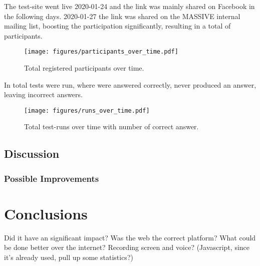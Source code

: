 \documentclass[nofilelist]{cslthse-msc}
\begin{document}
				The test-site went live 2020-01-24 and the link was mainly shared on
				Facebook in the following days. 2020-01-27 the link was shared on
				the MASSIVE internal mailing list, boosting the participation
				significantly, resulting in a total of
				 participants.

				\begin{figure}[h!]
					\centering
					\texttt{[image: figures/participants\_over\_time.pdf]}
					\caption{Total registered participants over time.}
				\end{figure}

				In total  tests were run, where
				 were answered correctly,
				 never produced an answer, leaving
				 incorrect answers.

				\begin{figure}[h!]
					\centering
					\texttt{[image: figures/runs\_over\_time.pdf]}
					\caption{Total test-runs over time with number of correct answer.}
				\end{figure}

		\section{Discussion}

			\subsection{Possible Improvements}

	\chapter{Conclusions}

		Did it have an significant impact? Was the web the correct platform? What
		could be done better over the internet? Recording screen and voice?
		(Javascript, since it's already used, pull up some statistics?)


	\checkoddpage
	\ifoddpage
	\else
		 \newpage
		 \thispagestyle{empty}
		 \mbox{ }
	\fi
\end{document}
